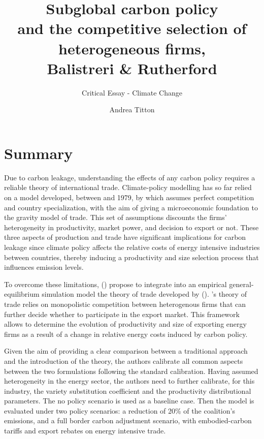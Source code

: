\documentclass[american]{scrartcl}
\title{Subglobal carbon policy \\ and the competitive selection of heterogeneous firms, \\ Balistreri \& Rutherford}
\subtitle{Critical Essay - Climate Change}
\author{Andrea Titton}
\newcommand{\citein}[1]{\citeauthor{#1} (\citeyear{#1})}
\begin{document}
\maketitle

\section{Summary}

Due to carbon leakage, understanding the effects of any carbon policy requires a reliable theory of international trade. Climate-policy modelling has so far relied on a model developed, between \citeyear{Armington1969} and 1979, by \citeauthor{Armington1969} which assumes perfect competition and country specialization, with the aim of giving a microeconomic foundation to the gravity model of trade. This set of assumptions discounts the firms' heterogeneity in productivity, market power, and decision to export or not. These three aspects of production and trade have significant implications for carbon leakage since climate policy affects the relative costs of energy intensive industries between countries, thereby inducing a productivity and size selection process that influences emission levels.

To overcome these limitations, \citein{Balistreri2012} propose to integrate into an empirical general-equilibrium simulation model the theory of trade developed by \citein{Melitz2003}. \citeauthor{Melitz2003}'s theory of trade relies on monopolistic competition between heterogenous firms that can further decide whether to participate in the export market. This framework allows to determine the evolution of productivity and size of exporting energy firms as a result of a change in relative energy costs induced by carbon policy.

Given the aim of providing a clear comparison between a traditional \citeauthor{Armington1969} approach and the introduction of the \citeauthor{Melitz2003} theory, the authors calibrate all common aspects between the two formulations following the standard \citeauthor{Armington1969} calibration. Having assumed heterogeneity in the energy sector, the authors need to further calibrate, for this industry, the variety substitution coefficient and the productivity distributional parameters. The no policy scenario is used as a baseline case. Then the model is evaluated under two policy scenarios: a reduction of 20\% of the coalition's emissions, and a full border carbon adjustment scenario,  with embodied-carbon tariffs and export rebates on energy intensive trade.
\end{document}
